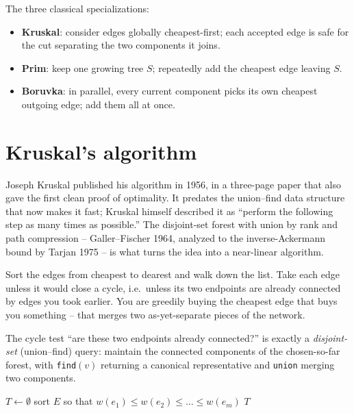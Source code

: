 The three classical specializations:

\begin{itemize}
\item \textbf{Kruskal}: consider edges globally cheapest-first; each accepted edge is safe for the cut separating the two components it joins.
\item \textbf{Prim}: keep one growing tree $S$; repeatedly add the cheapest edge leaving $S$.
\item \textbf{Boruvka}: in parallel, every current component picks its own cheapest outgoing edge; add them all at once.
\end{itemize}

\section{Kruskal's algorithm}

\begin{historybox}
Joseph Kruskal published his algorithm in 1956, in a three-page paper that also gave the first clean proof of optimality. It predates the union--find data structure that now makes it fast; Kruskal himself described it as ``perform the following step as many times as possible.'' The disjoint-set forest with union by rank and path compression -- Galler--Fischer 1964, analyzed to the inverse-Ackermann bound by Tarjan 1975 -- is what turns the idea into a near-linear algorithm.
\end{historybox}

\begin{intuitionbox}
Sort the edges from cheapest to dearest and walk down the list. Take each edge unless it would close a cycle, i.e.\ unless its two endpoints are already connected by edges you took earlier. You are greedily buying the cheapest edge that buys you something -- that merges two as-yet-separate pieces of the network.
\end{intuitionbox}

The cycle test ``are these two endpoints already connected?'' is exactly a \emph{disjoint-set} (union--find) query: maintain the connected components of the chosen-so-far forest, with \texttt{find}$(v)$ returning a canonical representative and \texttt{union} merging two components.

\begin{algorithm}[H]
\caption{Kruskal-MST}
\label{ch06:kruskal}
$T\gets\emptyset$\;
sort $E$ so that $w(e_1)\le w(e_2)\le\dots\le w(e_m)$\;
\Return $T$\;
\end{algorithm}

